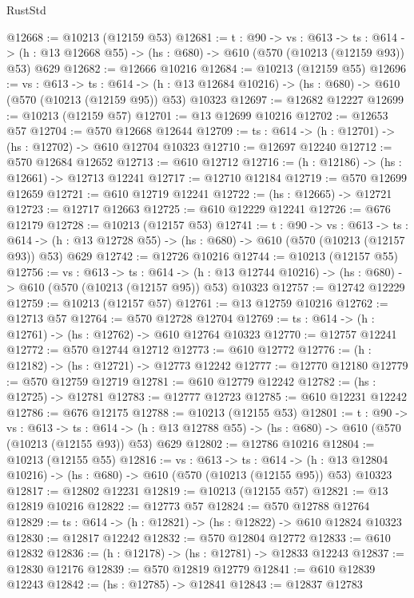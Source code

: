\begin{lexlean}{RustStd}
\begin{coremodule}
@12668 := @10213 (@12159 @53)
@12681 := {t : @90} ->
  {vs : @613} ->
  {ts : @614} -> (h : @13 @12668 @55) -> (hs : @680) -> @610 (@570 (@10213 (@12159 @93)) @53) @629
@12682 := @12666 @10216
@12684 := @10213 (@12159 @55)
@12696 := {vs : @613} ->
  {ts : @614} ->
  (h : @13 @12684 @10216) -> (hs : @680) -> @610 (@570 (@10213 (@12159 @95)) @53) @10323
@12697 := @12682 @12227
@12699 := @10213 (@12159 @57)
@12701 := @13 @12699 @10216
@12702 := @12653 @57
@12704 := @570 @12668 @12644
@12709 := {ts : @614} -> (h : @12701) -> (hs : @12702) -> @610 @12704 @10323
@12710 := @12697 @12240
@12712 := @570 @12684 @12652
@12713 := @610 @12712
@12716 := (h : @12186) -> (hs : @12661) -> @12713 @12241
@12717 := @12710 @12184
@12719 := @570 @12699 @12659
@12721 := @610 @12719 @12241
@12722 := (hs : @12665) -> @12721
@12723 := @12717 @12663
@12725 := @610 @12229 @12241
@12726 := @676 @12179
@12728 := @10213 (@12157 @53)
@12741 := {t : @90} ->
  {vs : @613} ->
  {ts : @614} -> (h : @13 @12728 @55) -> (hs : @680) -> @610 (@570 (@10213 (@12157 @93)) @53) @629
@12742 := @12726 @10216
@12744 := @10213 (@12157 @55)
@12756 := {vs : @613} ->
  {ts : @614} ->
  (h : @13 @12744 @10216) -> (hs : @680) -> @610 (@570 (@10213 (@12157 @95)) @53) @10323
@12757 := @12742 @12229
@12759 := @10213 (@12157 @57)
@12761 := @13 @12759 @10216
@12762 := @12713 @57
@12764 := @570 @12728 @12704
@12769 := {ts : @614} -> (h : @12761) -> (hs : @12762) -> @610 @12764 @10323
@12770 := @12757 @12241
@12772 := @570 @12744 @12712
@12773 := @610 @12772
@12776 := (h : @12182) -> (hs : @12721) -> @12773 @12242
@12777 := @12770 @12180
@12779 := @570 @12759 @12719
@12781 := @610 @12779 @12242
@12782 := (hs : @12725) -> @12781
@12783 := @12777 @12723
@12785 := @610 @12231 @12242
@12786 := @676 @12175
@12788 := @10213 (@12155 @53)
@12801 := {t : @90} ->
  {vs : @613} ->
  {ts : @614} -> (h : @13 @12788 @55) -> (hs : @680) -> @610 (@570 (@10213 (@12155 @93)) @53) @629
@12802 := @12786 @10216
@12804 := @10213 (@12155 @55)
@12816 := {vs : @613} ->
  {ts : @614} ->
  (h : @13 @12804 @10216) -> (hs : @680) -> @610 (@570 (@10213 (@12155 @95)) @53) @10323
@12817 := @12802 @12231
@12819 := @10213 (@12155 @57)
@12821 := @13 @12819 @10216
@12822 := @12773 @57
@12824 := @570 @12788 @12764
@12829 := {ts : @614} -> (h : @12821) -> (hs : @12822) -> @610 @12824 @10323
@12830 := @12817 @12242
@12832 := @570 @12804 @12772
@12833 := @610 @12832
@12836 := (h : @12178) -> (hs : @12781) -> @12833 @12243
@12837 := @12830 @12176
@12839 := @570 @12819 @12779
@12841 := @610 @12839 @12243
@12842 := (hs : @12785) -> @12841
@12843 := @12837 @12783

\end{coremodule}
\end{lexlean}
